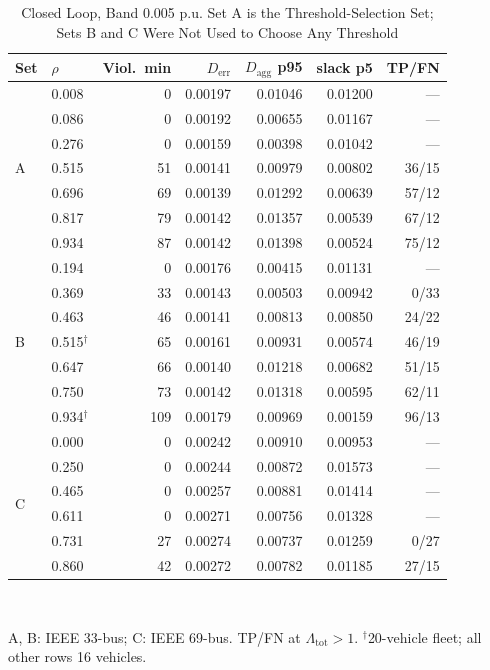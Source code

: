 \documentclass[lettersize,journal]{IEEEtran}
\newcommand{\Derr}{D_{\mathrm{err}}}
\newcommand{\Dagg}{D_{\mathrm{agg}}}
\newcommand{\Lamt}{\Lambda_{\mathrm{tot}}}
\begin{document}
\begin{table}[!t]
\renewcommand{\arraystretch}{1.1}
\caption{Closed Loop, Band 0.005 p.u. Set A is the Threshold-Selection Set;
Sets B and C Were Not Used to Choose Any Threshold}
\label{tab:closed}
\centering\footnotesize
\begin{tabular}{@{}llrrrrr@{}}
\toprule
Set & $\rho$ & Viol.\ min & $\Derr$ & $\Dagg$ p95 & slack p5 & TP/FN\\
\midrule
\multirow{7}{*}{A}
 & 0.008 & 0  & 0.00197 & 0.01046 & 0.01200 & ---\\
 & 0.086 & 0  & 0.00192 & 0.00655 & 0.01167 & ---\\
 & 0.276 & 0  & 0.00159 & 0.00398 & 0.01042 & ---\\
 & 0.515 & 51 & 0.00141 & 0.00979 & 0.00802 & 36/15\\
 & 0.696 & 69 & 0.00139 & 0.01292 & 0.00639 & 57/12\\
 & 0.817 & 79 & 0.00142 & 0.01357 & 0.00539 & 67/12\\
 & 0.934 & 87 & 0.00142 & 0.01398 & 0.00524 & 75/12\\
\midrule
\multirow{7}{*}{B}
 & 0.194 & 0   & 0.00176 & 0.00415 & 0.01131 & ---\\
 & 0.369 & 33  & 0.00143 & 0.00503 & 0.00942 & 0/33\\
 & 0.463 & 46  & 0.00141 & 0.00813 & 0.00850 & 24/22\\
 & 0.515$^{\dagger}$ & 65 & 0.00161 & 0.00931 & 0.00574 & 46/19\\
 & 0.647 & 66  & 0.00140 & 0.01218 & 0.00682 & 51/15\\
 & 0.750 & 73  & 0.00142 & 0.01318 & 0.00595 & 62/11\\
 & 0.934$^{\dagger}$ & 109 & 0.00179 & 0.00969 & 0.00159 & 96/13\\
\midrule
\multirow{6}{*}{C}
 & 0.000 & 0  & 0.00242 & 0.00910 & 0.00953 & ---\\
 & 0.250 & 0  & 0.00244 & 0.00872 & 0.01573 & ---\\
 & 0.465 & 0  & 0.00257 & 0.00881 & 0.01414 & ---\\
 & 0.611 & 0  & 0.00271 & 0.00756 & 0.01328 & ---\\
 & 0.731 & 27 & 0.00274 & 0.00737 & 0.01259 & 0/27\\
 & 0.860 & 42 & 0.00272 & 0.00782 & 0.01185 & 27/15\\
\bottomrule
\end{tabular}\\[2pt]
\raggedright\footnotesize A, B: IEEE 33-bus; C: IEEE 69-bus. TP/FN at
$\Lamt>1$. $^{\dagger}$20-vehicle fleet; all other rows 16 vehicles.
\end{table}
\end{document}
